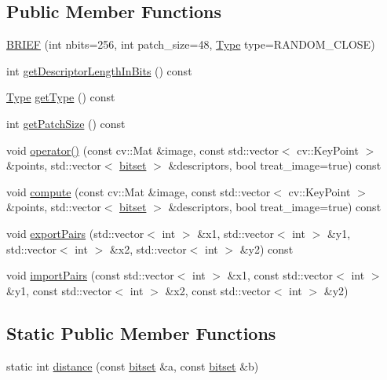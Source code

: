 \subsection*{Public Member Functions}
\begin{DoxyCompactItemize}
\item 
\hyperlink{classDVision_1_1BRIEF_a4dd74c26a2e1f4cb938f75fdad3e88cf}{B\+R\+I\+EF} (int nbits=256, int patch\+\_\+size=48, \hyperlink{classDVision_1_1BRIEF_a0203beaaafe3aca790393cc032eeb499}{Type} type=R\+A\+N\+D\+O\+M\+\_\+\+C\+L\+O\+SE)
\item 
int \hyperlink{classDVision_1_1BRIEF_aa7679cb7d06344d75e4375baf779b84c}{get\+Descriptor\+Length\+In\+Bits} () const
\item 
\hyperlink{classDVision_1_1BRIEF_a0203beaaafe3aca790393cc032eeb499}{Type} \hyperlink{classDVision_1_1BRIEF_ad2b1b7422d05905597e31939528cbd2a}{get\+Type} () const
\item 
int \hyperlink{classDVision_1_1BRIEF_aabaa4937582b567fa1f53ec6004cfc00}{get\+Patch\+Size} () const
\item 
void \hyperlink{classDVision_1_1BRIEF_a290ee93994c09ed3b2164c5d3df182a9}{operator()} (const cv\+::\+Mat \&image, const std\+::vector$<$ cv\+::\+Key\+Point $>$ \&points, std\+::vector$<$ \hyperlink{classDVision_1_1BRIEF_abc56a095174a93b0741099f35230b7c5}{bitset} $>$ \&descriptors, bool treat\+\_\+image=true) const
\item 
void \hyperlink{classDVision_1_1BRIEF_afda5792d22d954fabbadeed3388ca6c7}{compute} (const cv\+::\+Mat \&image, const std\+::vector$<$ cv\+::\+Key\+Point $>$ \&points, std\+::vector$<$ \hyperlink{classDVision_1_1BRIEF_abc56a095174a93b0741099f35230b7c5}{bitset} $>$ \&descriptors, bool treat\+\_\+image=true) const
\item 
void \hyperlink{classDVision_1_1BRIEF_a8000a709f6336e47359c6e9ee4a5efd5}{export\+Pairs} (std\+::vector$<$ int $>$ \&x1, std\+::vector$<$ int $>$ \&y1, std\+::vector$<$ int $>$ \&x2, std\+::vector$<$ int $>$ \&y2) const
\item 
void \hyperlink{classDVision_1_1BRIEF_a019cd2ef2f6757da94fdb1f74d20b581}{import\+Pairs} (const std\+::vector$<$ int $>$ \&x1, const std\+::vector$<$ int $>$ \&y1, const std\+::vector$<$ int $>$ \&x2, const std\+::vector$<$ int $>$ \&y2)
\end{DoxyCompactItemize}
\subsection*{Static Public Member Functions}
\begin{DoxyCompactItemize}
\item 
static int \hyperlink{classDVision_1_1BRIEF_a78718071fcf2700e3a0cc304dd4e1dcc}{distance} (const \hyperlink{classDVision_1_1BRIEF_abc56a095174a93b0741099f35230b7c5}{bitset} \&a, const \hyperlink{classDVision_1_1BRIEF_abc56a095174a93b0741099f35230b7c5}{bitset} \&b)
\end{DoxyCompactItemize}

